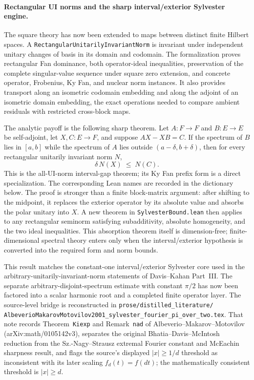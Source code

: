 \documentclass[11pt]{article}
\theoremstyle{remark}
\begin{document}
\paragraph{Rectangular UI norms and the sharp interval/exterior Sylvester engine.}
The square theory has now been extended to maps between distinct finite
Hilbert spaces.  A \texttt{RectangularUnitarilyInvariantNorm} is invariant
under independent unitary changes of basis in its domain and codomain.  The
formalization proves rectangular Fan dominance, both operator-ideal
inequalities, preservation of the complete singular-value sequence under
square zero extension, and concrete operator, Frobenius, Ky Fan, and nuclear
norm instances.  It also provides transport along an isometric codomain
embedding and along the adjoint of an isometric domain embedding, the exact
operations needed to compare ambient residuals with restricted cross-block
maps.

The analytic payoff is the following sharp theorem.  Let
$A:F\to F$ and $B:E\to E$ be self-adjoint, let $X,C:E\to F$, and suppose
$AX-XB=C$.  If the spectrum of $B$ lies in $[a,b]$ while the spectrum of $A$
lies outside $(a-\delta,b+\delta)$, then for every rectangular unitarily
invariant norm $N$,
\[
  \delta\,N(X)\;\le\;N(C).
\]
This is the all-UI-norm interval-gap theorem; its Ky Fan prefix form is a
direct specialization.  The corresponding Lean names are recorded in the
dictionary below.  The proof is stronger
than a finite block-matrix argument: after shifting to the midpoint, it replaces
the exterior operator by its absolute value and absorbs the polar unitary into
$X$.  A new theorem in \texttt{SylvesterBound.lean} then applies to any
rectangular seminorm satisfying subadditivity, absolute homogeneity, and the
two ideal inequalities.  This absorption theorem itself is dimension-free;
finite-dimensional spectral theory enters only when the interval/exterior
hypothesis is converted into the required form and norm bounds.

This result matches the constant-one interval/exterior Sylvester core used in
the arbitrary-unitarily-invariant-norm statements of Davis--Kahan Part~III.
The separate arbitrary-disjoint-spectrum estimate with constant $\pi/2$ has
now been factored into a scalar harmonic root and a completed finite operator
layer.  The source-level bridge is reconstructed in
\texttt{prose/distilled\_literature/}
\texttt{AlbeverioMakarovMotovilov2001\_sylvester\_fourier\_pi\_over\_two.tex}.
That note records Theorem~\texttt{Kiexp} and Remark~\texttt{nad} of
Albeverio--Makarov--Motovilov (arXiv:math/0105142v3), separates the original
Bhatia--Davis--McIntosh reduction from the Sz.-Nagy--Strausz extremal Fourier
constant and McEachin sharpness result, and flags the source's displayed
$|x|\ge 1/d$ threshold as inconsistent with its later scaling
$f_d(t)=f(dt)$; the mathematically consistent threshold is $|x|\ge d$.
\end{document}
